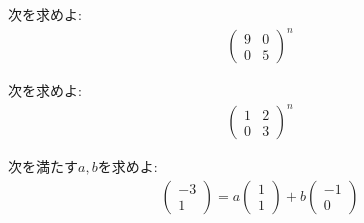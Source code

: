 \begin{quiz}
  次を求めよ:
  \begin{align*}
    \begin{pmatrix}
      9&0\\0&5
    \end{pmatrix}^n
  \end{align*}
\end{quiz}

\begin{quiz}
  次を求めよ:
  \begin{align*}
    \begin{pmatrix}
      1&2\\0&3
    \end{pmatrix}^n
  \end{align*}
\end{quiz}



\begin{quiz}
  次を満たす$a,b$を求めよ:
  \begin{align*}
    \begin{pmatrix}
      -3\\1
    \end{pmatrix}
    =
    a\begin{pmatrix}
      1\\1
    \end{pmatrix}
    +b\begin{pmatrix}
      -1\\0
    \end{pmatrix}
  \end{align*}
\end{quiz}


\endinput
\chapter{行列式と逆行列}
\label{chap:inverse}
ここでは,
行列式および逆行列に関して説明をする.

